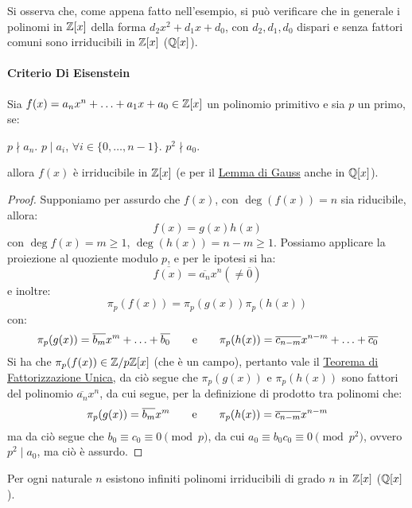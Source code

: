 \documentclass[11pt]{scrartcl}
\begin{document}
\begin{remark}
Si osserva che, come appena fatto nell'esempio, si può verificare che in generale i polinomi in $\mathbb Z[x]$ della forma $d_2x^2+d_1x+d_0$, con $d_2,d_1,d_0$ dispari e senza fattori comuni sono irriducibili in $\mathbb Z[x]$ ($\mathbb Q[x]$).
\end{remark}

\pagebreak
\paragraph{Criterio Di Eisenstein}

\begin{theorem}
\label{p:esien}
Sia $f(x) = a_nx^n + \ldots + a_1x + a_0 \in \mathbb Z[x]$ un polinomio primitivo e sia $p$ un primo, se:
	\begin{enumerate}[(i)]
	\ii $p \nmid a_n$.
	\ii $p \mid a_i$, $\forall i \in \{0,\ldots,n-1\}$.
	\ii $p^2 \nmid a_0$.
	\end{enumerate}
allora $f(x)$ è irriducibile in $\mathbb Z[x]$ (e per il \hyperref[p:Gauss]{Lemma di Gauss} anche in $\mathbb Q[x]$).
\end{theorem}

\begin{proof}
Supponiamo per assurdo che $f(x)$, con $\deg(f(x)) = n$ sia riducibile, allora:
	\[ f(x) = g(x)h(x)
	\]
con $\deg f(x) = m \geq 1$, $\deg(h(x)) = n-m \geq 1$. Possiamo applicare la proiezione al quoziente modulo $p$, e per le ipotesi si ha:
	\[ \overline{f(x)} = \overline{a_n}x^n (\ne \overline 0)
	\] 
e inoltre:
	\[ \pi_p(f(x)) =  \pi_p(g(x)) \pi_p(h(x))
	\]
con:
	\[ \pi_p(g(x)) = \overline{b_m}x^m + \ldots + \overline{b_0}
	\qquad
	\text e
	\qquad
	\pi_p(h(x)) = \overline{c_{n-m}}x^{n-m} + \ldots + \overline{c_0}
	\]
Si ha che $\pi_p(f(x)) \in {\mathbb Z}/p{\mathbb Z}[x]$ (che è un campo), pertanto vale il \hyperref[p:fac]{Teorema di Fattorizzazione Unica}, da ciò segue che $\pi_p(g(x))$ e $\pi_p(h(x))$ sono fattori del polinomio $\overline{a_n}x^n$, da cui segue, per la definizione di prodotto tra polinomi che:
	\[  \pi_p(g(x)) = \overline{b_m}x^m
	\qquad
	\text e
	\qquad
	\pi_p(h(x)) = \overline{c_{n-m}}x^{n-m}
	\]
ma da ciò segue che $b_0 \equiv c_0 \equiv 0 \pmod p$, da cui $a_0 \equiv b_0c_0 \equiv 0 \pmod{p^2}$, ovvero $p^2 \mid a_0$, ma ciò è assurdo.
\end{proof}

\begin{corollary}
\label{p:pE}
Per ogni naturale $n$ esistono infiniti polinomi irriducibili di grado $n$ in $\mathbb Z[x]$ ($\mathbb Q[x]$).
\end{corollary}
\end{document}
